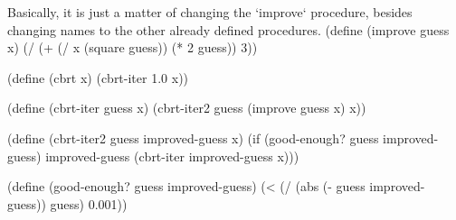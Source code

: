 Basically, it is just a matter of changing the `improve` procedure, besides changing names to the other already defined procedures.
\begscmtt
(define (improve guess x)
  (/ (+ (/ x (square guess))
        (* 2 guess))
     3))

(define (cbrt x)
  (cbrt-iter 1.0 x))

(define (cbrt-iter guess x)
  (cbrt-iter2 guess (improve guess x) x))

(define (cbrt-iter2 guess improved-guess x)
  (if (good-enough? guess improved-guess)
      improved-guess
      (cbrt-iter improved-guess x)))

(define (good-enough? guess improved-guess)
  (< (/ (abs (- guess improved-guess)) guess) 0.001))
\endtt
